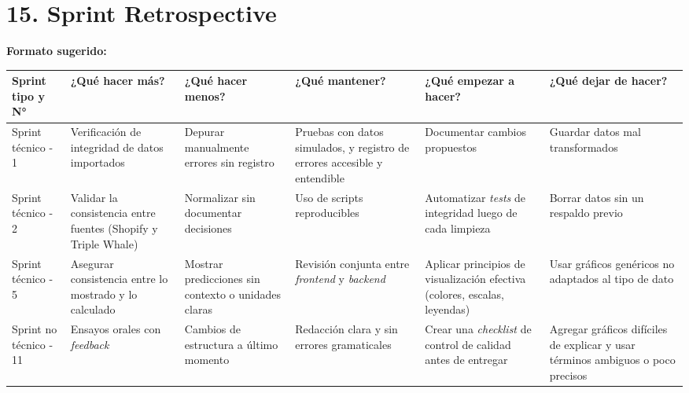 \documentclass[
11pt, %
]{charter}
\begin{document}
\section{15. Sprint Retrospective}    
\label{sec:sprint_retro}

\textbf{Formato sugerido:}

\begin{table}[htpb]
\renewcommand{\arraystretch}{1.4}
\begin{tabular}{|>{\raggedright\arraybackslash}p{1.8cm}|
                >{\raggedright\arraybackslash}p{2.3cm}|
                >{\raggedright\arraybackslash}p{2.3cm}|
                >{\raggedright\arraybackslash}p{2.3cm}|
                >{\raggedright\arraybackslash}p{2.3cm}|
                >{\raggedright\arraybackslash}p{2.3cm}|}
\hline
\rowcolor[HTML]{CCCCCC} 
\textbf{Sprint tipo y N°} & \textbf{¿Qué hacer más?} & \textbf{¿Qué hacer menos?} & \textbf{¿Qué mantener?} & \textbf{¿Qué empezar a hacer?} & \textbf{¿Qué dejar de hacer?} \\
\hline
Sprint técnico - 1 & Verificación de integridad de datos importados & Depurar manualmente errores sin registro & Pruebas con datos simulados, y registro de errores accesible y entendible & Documentar cambios propuestos & Guardar datos mal transformados \\
\hline
Sprint técnico - 2 & Validar la consistencia entre fuentes (Shopify y Triple Whale) & Normalizar sin documentar decisiones & Uso de scripts reproducibles & Automatizar \textit{tests} de integridad luego de cada limpieza & Borrar datos sin un respaldo previo \\
\hline
Sprint técnico - 5 & Asegurar consistencia entre lo mostrado y lo calculado & Mostrar predicciones sin contexto o unidades claras & Revisión conjunta entre \textit{frontend} y \textit{backend} & Aplicar principios de visualización efectiva (colores, escalas, leyendas) & Usar gráficos genéricos no adaptados al tipo de dato \\
\hline
Sprint no técnico - 11 & Ensayos orales con \textit{feedback} & Cambios de estructura a último momento & Redacción clara y sin errores gramaticales & Crear una \textit{checklist} de control de calidad antes de entregar & Agregar gráficos difíciles de explicar y usar términos ambiguos o poco precisos \\
\hline
\end{tabular}
\end{table}
\end{document}
